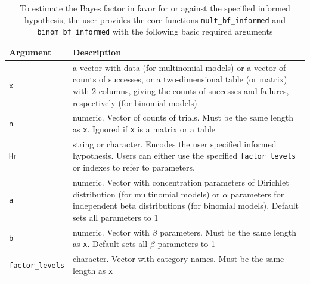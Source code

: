 \documentclass[
  english,
  man,floatsintext]{apa6}
\begin{document}
\begin{table}
\caption{To estimate the Bayes factor in favor for or against the specified informed hypothesis, the user provides the core functions \texttt{mult\_bf\_informed} and \texttt{binom\_bf\_informed} with the following basic required arguments}
\label{tab:arguments}
\begin{center}
\begin{tabular}{p{4cm}p{12cm}}
        \toprule
Argument & Description \\\midrule
\texttt{x} & a vector with data (for multinomial models) or a vector of counts of successes, or a two-dimensional table (or matrix) with 2 columns, giving the counts of successes and failures, respectively (for binomial models)  \\
\texttt{n} &  numeric. Vector of counts of trials. Must be the same length as \texttt{x}. Ignored if \texttt{x} is a matrix or a table \\
\texttt{Hr} & string or character. Encodes the user specified informed hypothesis. Users can either use the specified \texttt{factor\_levels} or indexes to refer to parameters.\\
\texttt{a} & numeric. Vector with concentration parameters of Dirichlet distribution (for multinomial models) or $\alpha$ parameters for independent beta distributions (for binomial models). Default sets all parameters to 1 \\
\texttt{b} & numeric. Vector with $\beta$ parameters. Must be the same length as \texttt{x}. Default sets all $\beta$ parameters to 1 \\
\texttt{factor\_levels} &  character. Vector with category names. Must be the same length as \texttt{x}\\
\bottomrule
\end{tabular}
\end{center}
\end{table}
\end{document}
